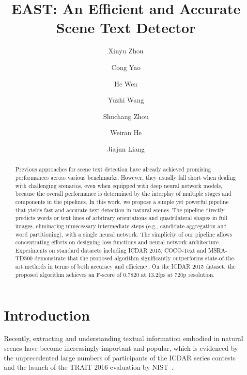 \documentclass[10pt,twocolumn,letterpaper]{article}
\begin{document}
\title{EAST: An Efficient and Accurate Scene Text Detector}

\author{Xinyu Zhou}
\author{Cong Yao}
\author{He Wen}
\author{Yuzhi Wang}
\author{Shuchang Zhou}
\author{Weiran He}
\author{Jiajun Liang}

\maketitle
\thispagestyle{empty}

\begin{abstract}

Previous approaches for scene text detection have already achieved promising performances across various benchmarks. However, they usually fall short when dealing with challenging scenarios, even when equipped with deep neural network models, because the overall performance is determined by the interplay of multiple stages and components in the pipelines. In this work, we propose a simple yet powerful pipeline that yields fast and accurate text detection in natural scenes. The pipeline directly predicts words or text lines of arbitrary orientations and quadrilateral shapes in full images, eliminating unnecessary intermediate steps (e.g., candidate aggregation and word partitioning), with a single neural network. The simplicity of our pipeline allows concentrating efforts on designing loss functions and neural network architecture. Experiments on standard datasets including ICDAR 2015, COCO-Text and MSRA-TD500 demonstrate that the proposed algorithm significantly outperforms state-of-the-art methods in terms of both accuracy and efficiency. On the ICDAR 2015 dataset, the proposed algorithm achieves an F-score of 0.7820 at 13.2fps at 720p resolution.
\vspace{-4mm}

\end{abstract}
 
\section{Introduction} \label{Sec:Introduction}

Recently, extracting and understanding textual information embodied in natural scenes have become increasingly important and popular, which is evidenced by the unprecedented large numbers of participants of the ICDAR series contests ~\cite{Ref:Shahab2011, Ref:Karatzas2013, Ref:Karatzas2015} and the launch of the TRAIT 2016 evaluation by NIST~\cite{Ref:TRAIT2015}.
\end{document}
